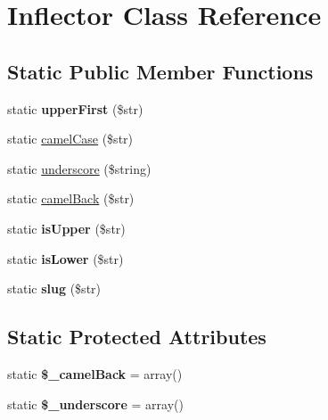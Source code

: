 \hypertarget{classInflector}{
\section{Inflector Class Reference}
\label{classInflector}
}
\subsection*{Static Public Member Functions}
\begin{DoxyCompactItemize}
\item 
\hypertarget{classInflector_a908104f472ffc12abdbf413907ac79e8}{
static {\bfseries upperFirst} (\$str)}
\label{classInflector_a908104f472ffc12abdbf413907ac79e8}

\item 
static \hyperlink{classInflector_a8a88a95ac17f430c6f12b84eb1248bf7}{camelCase} (\$str)
\item 
static \hyperlink{classInflector_a28be98649c8abe82e4c6dd59d8a52251}{underscore} (\$string)
\item 
static \hyperlink{classInflector_abae1c2ef023e5a0648a7a0daabba51e5}{camelBack} (\$str)
\item 
\hypertarget{classInflector_a896c15c7c8c0b1a90f56fc296c081d1f}{
static {\bfseries isUpper} (\$str)}
\label{classInflector_a896c15c7c8c0b1a90f56fc296c081d1f}

\item 
\hypertarget{classInflector_a2f6b727703c6e6e04a389154b4e74acb}{
static {\bfseries isLower} (\$str)}
\label{classInflector_a2f6b727703c6e6e04a389154b4e74acb}

\item 
\hypertarget{classInflector_afc39bbe1faba49520a80158fbdf9f2e2}{
static {\bfseries slug} (\$str)}
\label{classInflector_afc39bbe1faba49520a80158fbdf9f2e2}

\end{DoxyCompactItemize}
\subsection*{Static Protected Attributes}
\begin{DoxyCompactItemize}
\item 
\hypertarget{classInflector_aa9f0be1fd13b8c885df0f932d9b08ffb}{
static {\bfseries \$\_\-camelBack} = array()}
\label{classInflector_aa9f0be1fd13b8c885df0f932d9b08ffb}

\item 
\hypertarget{classInflector_a94b4787f78be8ac2b218e5d68278c55c}{
static {\bfseries \$\_\-underscore} = array()}
\label{classInflector_a94b4787f78be8ac2b218e5d68278c55c}

\end{DoxyCompactItemize}



